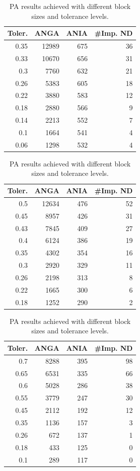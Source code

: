 \begin{table}[h]
\centering
\begin{subtable}[h]{0.45\textwidth}
\begin{tabular}{rrrr}
\hline
Toler. & ANGA  & ANIA & \#Imp. ND  \\ \hline
0.35 & 12989 & 675 & 36 \\
0.33 & 10670 & 656 & 31 \\
0.3  & 7760  & 632 & 21 \\
0.26 & 5383  & 605 & 18 \\
0.22 & 3880  & 583 & 12 \\
0.18 & 2880  & 566 & 9  \\
0.14 & 2213  & 552 & 7  \\
0.1  & 1664  & 541 & 4  \\
0.06 & 1298  & 532 & 4
 \end{tabular}
 \caption{Block size 500.}
 \label{tab:PA-block-size-500}
\end{subtable}
\hfill
\begin{subtable}[h]{0.45\textwidth}
\centering
\begin{tabular}{rrrr}
\hline
Toler. & ANGA  & ANIA & \#Imp. ND \\ \hline
0.5  & 12634 & 476 & 52 \\
0.45 & 8957  & 426 & 31 \\
0.43 & 7845	 & 409 & 27 \\
0.4  & 6124  & 386 & 19 \\
0.35 & 4302  & 354 & 16 \\
0.3  & 2920  & 329 & 11 \\
0.26 & 2198  & 313 & 8  \\
0.22 & 1665  & 300 & 6  \\
0.18 & 1252  & 290 & 2  
\end{tabular}
\caption{Block size 250.}
\label{tab:PA-block-size-250}
\end{subtable}

\begin{subtable}[h]{0.45\textwidth}
\centering
\begin{tabular}{rrrr}
\hline
Toler. & ANGA  & ANIA & \#Imp. ND \\ \hline
0.7  & 8288 & 395 & 98 \\
0.65 & 6531 & 335 & 66 \\
0.6  & 5028 & 286 & 38 \\
0.55 & 3779 & 247 & 30 \\
0.45 & 2112 & 192 & 12 \\
0.35 & 1136 & 157 & 3  \\
0.26 & 672  & 137 & 1  \\
0.18 & 433  & 125 & 0  \\
0.1  & 289  & 117 & 0  
\end{tabular}
\caption{Block size 100.}
\label{tab:PA-block-size-100}
\end{subtable}

\caption{PA results achieved with different block sizes and tolerance levels.}
\label{tab:PA-block-sizes}
\end{table}

